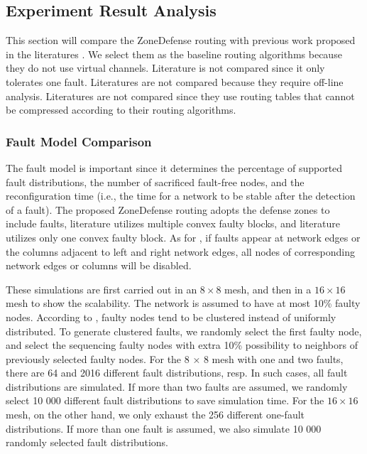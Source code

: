 \subsection{Experiment Result Analysis}
This section will compare the ZoneDefense routing with previous work proposed in the literatures \cite{wu2003fault} \cite{zhang2008reconfigurable}. We select them  as the baseline routing algorithms because they do not use virtual channels. Literature \cite{glass1993fault} is not compared since it only tolerates one fault. Literatures \cite{fu2011new} \cite{mejia2006segment} \cite{rodrigo2010addressing} are not compared because they require off-line analysis. Literatures \cite{fick2009highly} \cite{fick2009vicis} are not compared since they use routing tables that cannot be compressed according to their routing algorithms.

\subsubsection{Fault Model Comparison}
The fault model is important since it determines the percentage of supported fault distributions, the number of sacrificed fault-free nodes, and the reconfiguration time (i.e., the time for a network to be stable after the detection of a fault). The proposed ZoneDefense routing adopts the defense zones to include faults, literature \cite{wu2003fault} utilizes multiple convex faulty blocks, and literature \cite{zhang2008reconfigurable} utilizes only one convex faulty block. As for \cite{wu2003fault}, if faults appear at network edges or the columns adjacent to left and right network edges, all nodes of corresponding network edges or columns will be disabled.

These simulations are first carried out in an $8 \times 8$ mesh, and then in a $16 \times 16$ mesh to show the scalability. The network is assumed to have at most 10\% faulty nodes. According to \cite{meyer1989modeling}, faulty nodes tend to be clustered instead of uniformly distributed. To generate clustered faults, we randomly select the first faulty node, and select the sequencing faulty nodes with extra 10\% possibility to neighbors of previously selected faulty nodes. For the 8 × 8 mesh with one and two faults, there are 64 and 2016 different fault distributions, resp. In such cases, all fault distributions are simulated. If more than two faults are assumed, we randomly select 10 000 different fault distributions to save simulation time. For the $16 \times 16$ mesh, on the other hand, we only exhaust the 256 different one-fault distributions. If more than one fault is assumed, we also simulate 10 000 randomly selected fault distributions.

